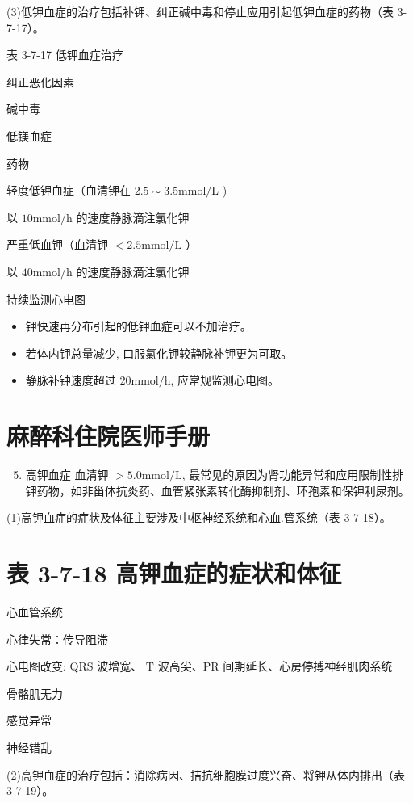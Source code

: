 \documentclass[10pt]{article}
\begin{document}
(3)低钾血症的治疗包括补钾、纠正碱中毒和停止应用引起低钾血症的药物（表 3-7-17）。

表 3-7-17 低钾血症治疗

纠正恶化因素

碱中毒

低镁血症

药物

轻度低钾血症（血清钾在 $2.5 \sim 3.5 \mathrm{mmol} / \mathrm{L}$ )

以 $10 \mathrm{mmol} / \mathrm{h}$ 的速度静脉滴注氯化钾

严重低血钾（血清钾 $<2.5 \mathrm{mmol} / \mathrm{L}$ ）

以 $40 \mathrm{mmol} / \mathrm{h}$ 的速度静脉滴注氯化钾

持续监测心电图

\begin{itemize}
  \item 钾快速再分布引起的低钾血症可以不加治疗。
  \item 若体内钾总量减少, 口服氯化钾较静脉补钾更为可取。
  \item 静脉补钟速度超过 $20 \mathrm{mmol} / \mathrm{h}$, 应常规监测心电图。
\end{itemize}

\section*{麻醉科住院医师手册}
\begin{enumerate}
  \setcounter{enumi}{4}
  \item 高钾血症 血清钾 $>5.0 \mathrm{mmol} / \mathrm{L}$, 最常见的原因为肾功能异常和应用限制性排钾药物，如非甾体抗炎药、血管紧张素转化酶抑制剂、环孢素和保钾利尿剂。
\end{enumerate}

(1)高钾血症的症状及体征主要涉及中枢神经系统和心血.管系统（表 3-7-18）。

\section*{表 3-7-18 高钾血症的症状和体征}
心血管系统

心律失常：传导阻滞

心电图改变: QRS 波增宽、 $\mathrm{T}$ 波高尖、PR 间期延长、心房停搏神经肌肉系统

骨骼肌无力

感觉异常

神经错乱

(2)高钾血症的治疗包括：消除病因、拮抗细胞膜过度兴奋、将钾从体内排出（表 3-7-19）。
\end{document}
